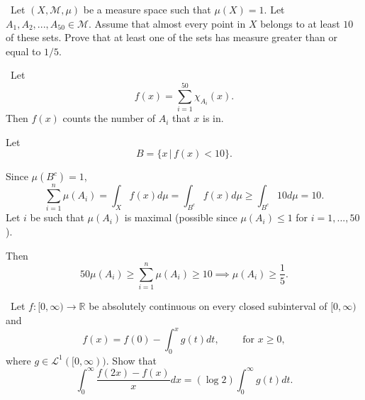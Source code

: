 \documentclass[12pt]{Homework}
\begin{document}
\begin{problem} $\,$
Let $(X,\mathscr{M},\mu)$ be a measure space such that $\mu(X)=1.$ Let $A_1, A_2,...,A_{50}\in\mathscr{M}$. Assume that almost every point in $X$ belongs to at least $10$ of these sets. Prove that at least one of the sets has measure greater than or equal to $1/5.$
\end{problem}


\begin{solution}$\,$
Let $$f(x)=\sum_{i=1}^{50}\chi_{A_i}(x).$$ Then $f(x)$ counts the number of $A_i$ that $x$ is in. 

Let $$B=\{x\,|\, f(x)<10\}.$$ 

Since $\mu(B^c)=1$, $$\sum_{i=1}^n\mu(A_i)=\int_Xf(x)d\mu=\int_{B^c}f(x)d\mu\ge\int_{B^c}10d\mu=10.$$ Let $i$ be such that $\mu(A_i)$ is maximal (possible since $\mu(A_i)\le 1$ for $i=1,...,50$).

Then $$50\mu(A_i)\ge\sum_{i=1}^n\mu(A_i)\ge10\implies \mu(A_i)\ge\frac{1}{5}.$$
\end{solution}
\newpage

\begin{problem} $\,$
Let $f:[0,\infty)\to\mathbb{R}$ be absolutely continuous on every closed subinterval of $[0,\infty)$ and $$f(x)=f(0)-\int_0^xg(t)dt,\qquad\text{ for }x\ge0,$$ where $g\in\mathscr{L}^1([0,\infty)).$ Show that $$\int_0^\infty\frac{f(2x)-f(x)}{x}dx=(\log 2)\int_0^\infty g(t)dt.$$ 
\end{problem}
\end{document}

